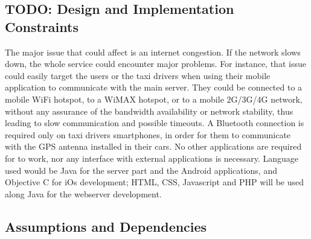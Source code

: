 \subsection{TODO: Design and Implementation Constraints}
The major issue that could affect \myTaxiService{} is an internet congestion. If the network slows down, the whole service could encounter major problems.
For instance, that issue could easily target the users or the taxi drivers when using their mobile application to communicate with the main server.
They could be connected to a mobile WiFi hotspot, to a WiMAX hotspot, or to a mobile 2G/3G/4G network, without any assurance of the bandwidth availability or network stability, thus leading to slow communication and possible timeouts.
A Bluetooth connection is required only on taxi drivers smartphones, in order for them to communicate with the GPS antenna installed in their cars.
No other applications are required for \myTaxiService{} to work, nor any interface with external applications is necessary.
Language used would be Java for the server part and the Android applications, and Objective C for iOs development; HTML, CSS, Javascript and PHP will be used along Java for the webserver development.
\subsection{Assumptions and Dependencies}
